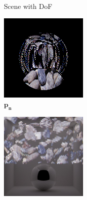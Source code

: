 \begin{figure}[]
\begin{subfigure}{\textwidth}
\begin{subfigure}{0.32\textwidth}
            \caption*{Scene with DoF}
        \end{subfigure}

        \begin{subfigure}{0.32\textwidth}
            \centering
            \includegraphics[width=\textwidth]{images/04-experiment03/dof/normal.jpg}
            \caption*{\(\bm{p_n}\)}
        \end{subfigure}
        \hfill
        \begin{subfigure}{0.32\textwidth}
            \centering
            \includegraphics[width=\textwidth]{images/04-experiment03/dof/normal_on_normal.jpg}

\end{subfigure}
\end{subfigure}
\end{figure}
